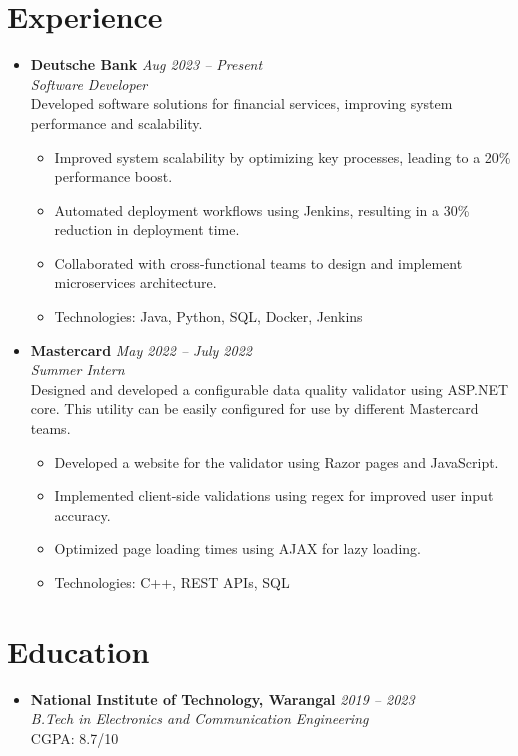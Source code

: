 \documentclass[a4paper,10pt]{article} %
\begin{document}
\section*{Experience}
\begin{itemize}[leftmargin=0.3in, itemsep=3pt, topsep=2pt] %
    \item
    \textbf{Deutsche Bank} \hfill \textit{Aug 2023 – Present} \\
    \textit{Software Developer} \\
    Developed software solutions for financial services, improving system performance and scalability.
    \begin{itemize}[leftmargin=*]
        \item Improved system scalability by optimizing key processes, leading to a 20\% performance boost.
        \item Automated deployment workflows using Jenkins, resulting in a 30\% reduction in deployment time.
        \item Collaborated with cross-functional teams to design and implement microservices architecture.
        \item Technologies: Java, Python, SQL, Docker, Jenkins
    \end{itemize}

    \item
    \textbf{Mastercard} \hfill \textit{May 2022 – July 2022} \\
    \textit{Summer Intern} \\
    Designed and developed a configurable data quality validator using ASP.NET core. This utility can be easily configured for use by different Mastercard teams.
    \begin{itemize}[leftmargin=*]
        \item Developed a website for the validator using Razor pages and JavaScript.
        \item Implemented client-side validations using regex for improved user input accuracy.
        \item Optimized page loading times using AJAX for lazy loading.
        \item Technologies: C++, REST APIs, SQL
    \end{itemize}
\end{itemize}

\vspace{0.7em} %

\section*{Education}
\begin{itemize}[leftmargin=0.3in, itemsep=3pt, topsep=2pt]
    \item
    \textbf{National Institute of Technology, Warangal} \hfill \textit{2019 – 2023} \\
    \textit{B.Tech in Electronics and Communication Engineering} \\
    CGPA: 8.7/10
\end{itemize}
\end{document}
